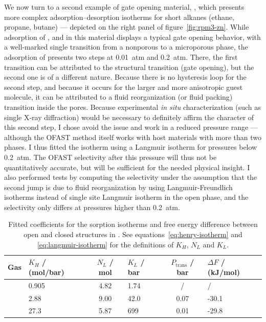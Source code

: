 \documentclass[thesis]{subfiles}
\begin{document}
We now turn to a second example of gate opening material, \RPMZn\cite{Lan2009},
which presents more complex adsorption--desorption isotherms for short alkanes
(ethane, propane, butane) --- depicted on the right panel of
figure~\ref{fig:rpm3-zn}. While adsorption of , and  in this
material displays a typical gate opening behavior, with a well-marked single
transition from a nonporous to a microporous phase, the adsorption of 
presents two steps at \SI{0.01}{atm} and \SI{0.2}{atm}. There, the first
transition can be attributed to the structural transition (gate opening), but
the second one is of a different nature. Because there is no hysteresis loop for
the second step, and because it occurs for the larger and more anisotropic guest
molecule, it can be attributed to a fluid reorganization (or fluid packing)
transition inside the pores. Because experimental \emph{in situ}
characterization (such as single X-ray diffraction) would be necessary to
definitely affirm the character of this second step, I chose avoid the issue and
work in a reduced pressure range --- although the OFAST method itself works with
host materials with more than two phases. I thus fitted the  isotherm
using a Langmuir isotherm for pressures below \SI{0.2}{atm}.  The OFAST
selectivity after this pressure will thus not be quantitatively accurate, but
will be sufficient for the needed physical insight. I also performed tests by
computing the selectivity under the assumption that the second jump is due to
fluid reorganization by using Langmuir-Freundlich isotherms instead of single
site Langmuir isotherm in the open phase, and the selectivity only differs at
pressures higher than \SI{0.2}{atm}.

\begin{table}[htp]
    \renewcommand{\arraystretch}{1.3}
    \begin{tabularx}{\textwidth}{c C c C c C}
        \textbf{Gas} & $K_H$ / (mol/bar) & $N_L$ / mol & $K_L$ / bar & $P_\text{trans}$ / bar & $\Delta F$ / (kJ/mol)  \\ \hline
            & 0.905             & 4.82        & 1.74        &            /           &          /             \\
            & 2.88              & 9.00        & 42.0        &           0.07         &        -30.1           \\
           & 27.3              & 5.87        & 699         &           0.01         &        -29.8           \\
    \end{tabularx}
    \caption{Fitted coefficients for the sorption isotherms and free energy
    difference between open and closed structures in \RPMZn. See
    equations~\eqref{eq:henry-isotherm} and \eqref{eq:langmuir-isotherm} for the
    definitions of $K_H$, $N_L$ and $K_L$.}
    \label{table:rpm3-zn:fit}
\end{table}
\end{document}
